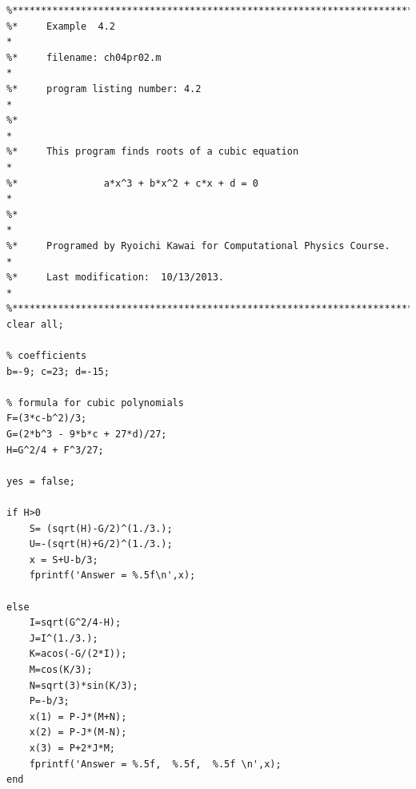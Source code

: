 \bigskip\noindent
\program
\label{prog:roots_cubic}
\footnotesize
\begin{verbatim}
%**************************************************************************
%*     Example  4.2                                                       *
%*     filename: ch04pr02.m                                               *
%*     program listing number: 4.2                                        *
%*                                                                        *
%*     This program finds roots of a cubic equation                       *
%*               a*x^3 + b*x^2 + c*x + d = 0                              *
%*                                                                        *
%*     Programed by Ryoichi Kawai for Computational Physics Course.       *
%*     Last modification:  10/13/2013.                                    *
%**************************************************************************
clear all;

% coefficients
b=-9; c=23; d=-15;

% formula for cubic polynomials
F=(3*c-b^2)/3;
G=(2*b^3 - 9*b*c + 27*d)/27;
H=G^2/4 + F^3/27;

yes = false;

if H>0
    S= (sqrt(H)-G/2)^(1./3.);
    U=-(sqrt(H)+G/2)^(1./3.);
    x = S+U-b/3;
    fprintf('Answer = %.5f\n',x);

else
    I=sqrt(G^2/4-H);
    J=I^(1./3.);
    K=acos(-G/(2*I));
    M=cos(K/3);
    N=sqrt(3)*sin(K/3);
    P=-b/3;    
    x(1) = P-J*(M+N);
    x(2) = P-J*(M-N);
    x(3) = P+2*J*M;
    fprintf('Answer = %.5f,  %.5f,  %.5f \n',x);
end
\end{verbatim}
\normalsize


